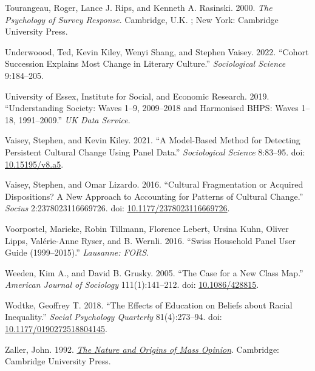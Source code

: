 \documentclass[
  11pt,
]{article}
\newlength{\cslhangindent}
\newenvironment{CSLReferences}[2] %
 {\begin{list}{}{%
  \setlength{\itemindent}{0pt}
  \setlength{\leftmargin}{0pt}
  \setlength{\parsep}{0pt}
  \ifodd #1
   \setlength{\leftmargin}{\cslhangindent}
   \setlength{\itemindent}{-1\cslhangindent}
  \fi
  \setlength{\itemsep}{#2\baselineskip}}}
 {\end{list}}
\begin{document}
\begin{CSLReferences}{1}{1}
Tourangeau, Roger, Lance J. Rips, and Kenneth A. Rasinski. 2000.
\emph{The Psychology of Survey Response}. Cambridge, U.K. ; New York:
Cambridge University Press.

Underwoood, Ted, Kevin Kiley, Wenyi Shang, and Stephen Vaisey. 2022.
{``Cohort Succession Explains Most Change in Literary Culture.''}
\emph{Sociological Science} 9:184--205.

University of Essex, Institute for Social, and Economic Research. 2019.
{``Understanding Society: Waves 1--9, 2009--2018 and Harmonised BHPS:
Waves 1--18, 1991--2009.''} \emph{UK Data Service}.

Vaisey, Stephen, and Kevin Kiley. 2021. {``A {Model}-{Based} {Method}
for {Detecting} {Persistent} {Cultural} {Change} {Using} {Panel}
{Data}.''} \emph{Sociological Science} 8:83--95. doi:
\href{https://doi.org/10.15195/v8.a5}{10.15195/v8.a5}.

Vaisey, Stephen, and Omar Lizardo. 2016. {``Cultural {Fragmentation} or
{Acquired} {Dispositions}? {A} {New} {Approach} to {Accounting} for
{Patterns} of {Cultural} {Change}.''} \emph{Socius} 2:2378023116669726.
doi:
\href{https://doi.org/10.1177/2378023116669726}{10.1177/2378023116669726}.

Voorpostel, Marieke, Robin Tillmann, Florence Lebert, Ursina Kuhn,
Oliver Lipps, Valérie-Anne Ryser, and B. Wernli. 2016. {``Swiss
Household Panel User Guide (1999--2015).''} \emph{Lausanne: FORS}.

Weeden, Kim A., and David B. Grusky. 2005. {``The {Case} for a {New}
{Class} {Map}.''} \emph{American Journal of Sociology} 111(1):141--212.
doi: \href{https://doi.org/10.1086/428815}{10.1086/428815}.

Wodtke, Geoffrey T. 2018. {``The {Effects} of {Education} on {Beliefs}
about {Racial} {Inequality}.''} \emph{Social Psychology Quarterly}
81(4):273--94. doi:
\href{https://doi.org/10.1177/0190272518804145}{10.1177/0190272518804145}.

Zaller, John. 1992.
\emph{\href{https://doi.org/10.1017/CBO9780511818691}{The {Nature} and
{Origins} of {Mass} {Opinion}}}. Cambridge: Cambridge University Press.

\end{CSLReferences}
\end{document}
